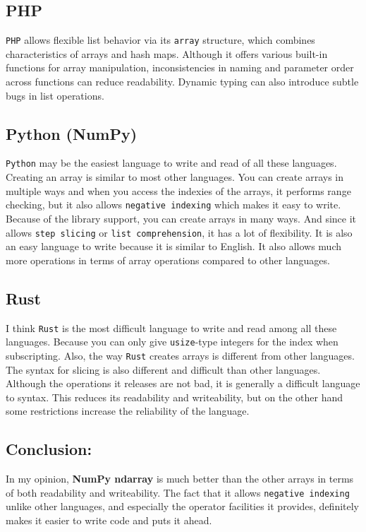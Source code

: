 \documentclass{article}
\begin{document}
\subsection{PHP}
\texttt{PHP} allows flexible list behavior via its \texttt{array} structure, which combines characteristics of arrays and hash maps. Although it offers various built-in functions for array manipulation, inconsistencies in naming and parameter order across functions can reduce readability. Dynamic typing can also introduce subtle bugs in list operations.

\subsection{Python (NumPy)} 
\texttt{Python} may be the easiest language to write and read of all these languages. Creating an array is similar to most other languages. You can create arrays in multiple ways and when you access the indexies of the arrays, it performs range checking, but it also allows \texttt{negative indexing} which makes it easy to write. 
Because of the library support, you can create arrays in many ways. And since it allows \texttt{step slicing} or \texttt{list comprehension}, it has a lot of flexibility. It is also an easy language to write because it is similar to English. It also allows much more operations in terms of array operations compared to other languages.

\subsection{Rust}
I think \texttt{Rust} is the most difficult language to write and read among all these languages. Because you can only give \texttt{usize}-type integers for the index when subscripting. Also, the way \texttt{Rust} creates arrays is different from other languages. The syntax for slicing is also different and difficult than other languages. Although the operations it releases are not bad, it is generally a difficult language to syntax. This reduces its readability and writeability, but on the other hand some restrictions increase the reliability of the language. 

\vspace{10pt}
\subsection{Conclusion:}
In my opinion, \textbf{NumPy ndarray} is much better than the other arrays in terms of both readability and writeability. The fact that it allows \texttt{negative indexing} unlike other languages, and especially the operator facilities it provides, definitely makes it easier to write code and puts it ahead.
\end{document}
